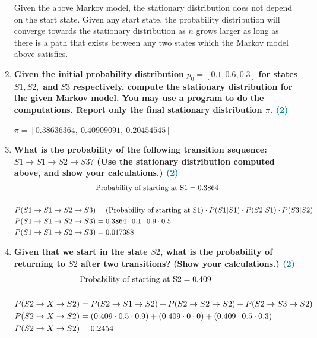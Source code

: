 \documentclass[a4paper]{article}
\begin{document}
\begin{sloppypar}
\begin{enumerate}[start=1,label=Q\arabic*,left=0pt]
    \par Given the above Markov model, the stationary distribution does not depend on the start state. Given any start state,
    the probability distribution will converge towards the stationary distribution as $n$ grows larger as long as there is a path that
    exists between any two states which the Markov model above satisfies.
    
    \item \textbf{Given the initial probability distribution} $p_0 = [0.1, 0.6, 0.3]$ \textbf{for states} $S1, S2,$ \textbf{and} $S3$ \textbf{respectively, compute the stationary distribution for the given Markov model. You may use a program to do the computations. Report only the final stationary distribution ${\pi}$. \hfill \textcolor{teal}{(2)}}

    \par $ \pi = [0.38636364, \: 0.40909091, \: 0.20454545] $
    
    \item \textbf{What is the probability of the following transition sequence: $S1 \rightarrow S1 \rightarrow S2 \rightarrow S3?$ (Use the stationary distribution computed above, and show your calculations.) \hfill \textcolor{teal}{(2)}}
    \begin{align*}
        & \hfill \text{Probability of starting at S1} \hfill = 0.3864 \\\\
        P(S1 \rightarrow S1 \rightarrow S2 \rightarrow S3) &= \text{(Probability of starting at S1)} \cdot P(S1 | S1) \cdot P(S2 | S1) \cdot P(S3 | S2) \\
        P(S1 \rightarrow S1 \rightarrow S2 \rightarrow S3) &= 0.3864 \cdot 0.1 \cdot 0.9 \cdot 0.5 \\
        P(S1 \rightarrow S1 \rightarrow S2 \rightarrow S3) &= 0.017388
    \end{align*}
    
    \item \textbf{Given that we start in the state $S2$, what is the probability of returning to $S2$ after two transitions? (Show your calculations.) \hfill \textcolor{teal}{(2)}}
    \begin{align*}
        & \hfill \text{Probability of starting at S2} \hfill = 0.409 \\\\
        P(S2 \rightarrow X \rightarrow S2) &= P(S2 \rightarrow S1 \rightarrow S2) + P(S2 \rightarrow S2 \rightarrow S2) + P(S2 \rightarrow S3 \rightarrow S2) \\
        P(S2 \rightarrow X \rightarrow S2) &= (0.409 \cdot 0.5 \cdot 0.9) + (0.409 \cdot 0 \cdot 0) + (0.409 \cdot 0.5 \cdot 0.3) \\
        P(S2 \rightarrow X \rightarrow S2) &= 0.2454
    \end{align*}


\end{enumerate}
\end{sloppypar}
\end{document}
